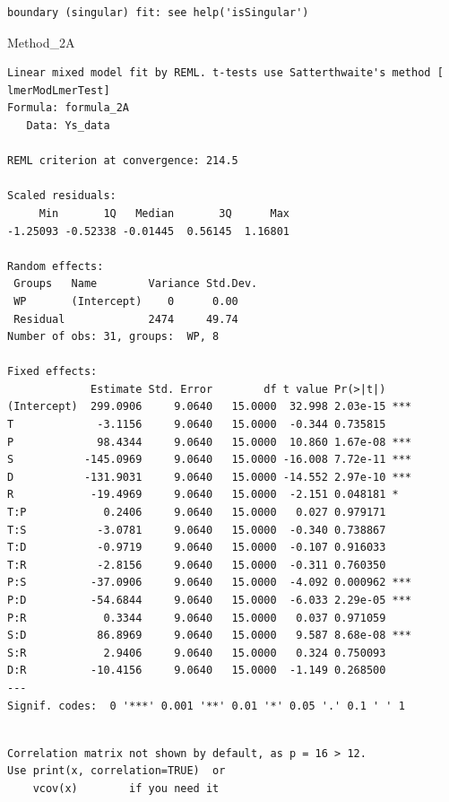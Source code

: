 \documentclass[
  letterpaper,
  DIV=11,
  numbers=noendperiod]{scrartcl}
\newenvironment{Shaded}{\begin{snugshade}}{\end{snugshade}}
\newcommand{\NormalTok}[1]{\textcolor[rgb]{0.00,0.23,0.31}{#1}}
\begin{document}
\begin{verbatim}
boundary (singular) fit: see help('isSingular')
\end{verbatim}

\begin{Shaded}
\begin{Highlighting}[]
\NormalTok{Method\_2A}
\end{Highlighting}
\end{Shaded}

\begin{verbatim}
Linear mixed model fit by REML. t-tests use Satterthwaite's method [
lmerModLmerTest]
Formula: formula_2A
   Data: Ys_data

REML criterion at convergence: 214.5

Scaled residuals: 
     Min       1Q   Median       3Q      Max 
-1.25093 -0.52338 -0.01445  0.56145  1.16801 

Random effects:
 Groups   Name        Variance Std.Dev.
 WP       (Intercept)    0      0.00   
 Residual             2474     49.74   
Number of obs: 31, groups:  WP, 8

Fixed effects:
             Estimate Std. Error        df t value Pr(>|t|)    
(Intercept)  299.0906     9.0640   15.0000  32.998 2.03e-15 ***
T             -3.1156     9.0640   15.0000  -0.344 0.735815    
P             98.4344     9.0640   15.0000  10.860 1.67e-08 ***
S           -145.0969     9.0640   15.0000 -16.008 7.72e-11 ***
D           -131.9031     9.0640   15.0000 -14.552 2.97e-10 ***
R            -19.4969     9.0640   15.0000  -2.151 0.048181 *  
T:P            0.2406     9.0640   15.0000   0.027 0.979171    
T:S           -3.0781     9.0640   15.0000  -0.340 0.738867    
T:D           -0.9719     9.0640   15.0000  -0.107 0.916033    
T:R           -2.8156     9.0640   15.0000  -0.311 0.760350    
P:S          -37.0906     9.0640   15.0000  -4.092 0.000962 ***
P:D          -54.6844     9.0640   15.0000  -6.033 2.29e-05 ***
P:R            0.3344     9.0640   15.0000   0.037 0.971059    
S:D           86.8969     9.0640   15.0000   9.587 8.68e-08 ***
S:R            2.9406     9.0640   15.0000   0.324 0.750093    
D:R          -10.4156     9.0640   15.0000  -1.149 0.268500    
---
Signif. codes:  0 '***' 0.001 '**' 0.01 '*' 0.05 '.' 0.1 ' ' 1
\end{verbatim}

\begin{verbatim}

Correlation matrix not shown by default, as p = 16 > 12.
Use print(x, correlation=TRUE)  or
    vcov(x)        if you need it
\end{verbatim}
\end{document}
